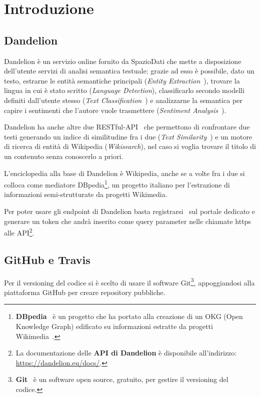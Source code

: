 \chapter{Introduzione}
\section{Dandelion}

Dandelion è un servizio online fornito da SpazioDati che mette a disposizione dell'utente servizi di analisi semantica testuale; 
grazie ad esso è possibile, dato un testo, estrarne le entità semantiche principali (\textit{Entity Extraction}~\cite{entity-extraction-demo}), trovare la lingua in cui è stato 
scritto (\textit{Language Detection}), classificarlo secondo modelli definiti dall'utente stesso (\textit{Text Classification}~\cite{text-classification-demo}) e analizzarne la semantica 
per capire i sentimenti che l'autore vuole trasmettere (\textit{Sentiment Analysis}~\cite{sentiment-analysis-demo}). 

Dandelion ha anche altre due RESTful-API~\cite{rest, api} che permettono di confrontare due testi generando un indice di similitudine fra i due
(\textit{Text Similarity}~\cite{text-similarity-demo}) e un motore di ricerca di entità di Wikipedia (\textit{Wikisearch}), nel caso si voglia trovare il titolo 
di un contenuto senza conoscerlo a priori.

L'enciclopedia alla base di Dandelion è Wikipedia, anche se a volte fra i due si colloca come mediatore DBpedia\footnote{
    \textbf{DBpedia}~\cite{dbpedia} è un progetto che ha portato alla creazione di un OKG (Open Knowledge Graph) edificato su informazioni estratte da progetti Wikimedia~\cite{wikimedia}. 
}, un progetto italiano per l'estrazione di informazioni semi-strutturate da progetti Wikimedia. 

Per poter usare gli endpoint di Dandelion basta registrarsi~\cite{dandelion-registration} sul portale dedicato e generare un token che andrà inserito come query parameter nelle 
chiamate https alle API\footnote{
    La documentazione delle \textbf{API di Dandelion} è disponibile all'indirizzo: \href{https://dandelion.eu/docs/}{https://dandelion.eu/docs/}.
}.

\section{GitHub e Travis}
Per il versioning del codice si è scelto di usare il software Git\footnote{
    \textbf{Git}~\cite{git} è un software open source, gratuito, per gestire il versioning del codice.
}, appoggiandosi alla piattaforma GitHub per creare repository pubbliche. 


